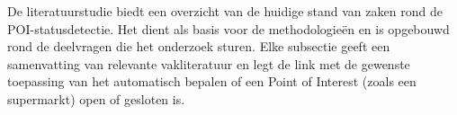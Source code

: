 




De literatuurstudie biedt een overzicht van de huidige stand van zaken rond de POI-statusdetectie. Het dient als basis voor de methodologieën en is opgebouwd rond de deelvragen die het onderzoek sturen. Elke subsectie geeft een samenvatting van relevante vakliteratuur en legt de link met de gewenste toepassing van het automatisch bepalen of een Point of Interest (zoals een supermarkt) open of gesloten is.

